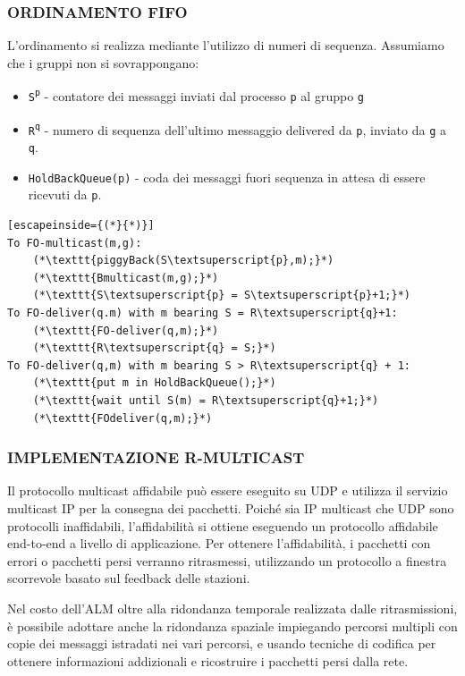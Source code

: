 \subsubsection{ORDINAMENTO FIFO}
L'ordinamento si realizza mediante l'utilizzo di numeri di sequenza. Assumiamo che i gruppi non si sovrappongano:
\begin{itemize}
   \item \texttt{S\textsuperscript{p}} - contatore dei messaggi inviati dal processo \texttt{p} al gruppo \texttt{g}
    \item \texttt{R\textsuperscript{q}} - numero di sequenza dell'ultimo messaggio delivered da \texttt{p}, inviato da \texttt{g} a \texttt{q}.
    \item \texttt{HoldBackQueue(p)} - coda dei messaggi fuori sequenza in attesa di essere ricevuti da \texttt{p}.
\end{itemize}
\begin{lstlisting}[escapeinside={(*}{*)}]
To FO-multicast(m,g):
    (*\texttt{piggyBack(S\textsuperscript{p},m);}*)
    (*\texttt{Bmulticast(m,g);}*)
    (*\texttt{S\textsuperscript{p} = S\textsuperscript{p}+1;}*)
To FO-deliver(q.m) with m bearing S = R\textsuperscript{q}+1:
    (*\texttt{FO-deliver(q,m);}*)
    (*\texttt{R\textsuperscript{q} = S;}*)
To FO-deliver(q,m) with m bearing S > R\textsuperscript{q} + 1:
    (*\texttt{put m in HoldBackQueue();}*)
    (*\texttt{wait until S(m) = R\textsuperscript{q}+1;}*)
    (*\texttt{FOdeliver(q,m);}*)
\end{lstlisting}
\subsubsection{IMPLEMENTAZIONE R-MULTICAST}
Il protocollo multicast affidabile può essere eseguito su UDP e utilizza il servizio multicast IP per la consegna dei pacchetti. Poiché sia IP multicast che UDP sono protocolli inaffidabili, l'affidabilità si ottiene eseguendo un protocollo affidabile end-to-end a livello di applicazione. Per ottenere l'affidabilità, i pacchetti con errori o pacchetti persi verranno ritrasmessi, utilizzando un protocollo a finestra scorrevole basato sul feedback delle stazioni.

Nel costo dell'ALM oltre alla ridondanza temporale realizzata dalle ritrasmissioni, è possibile adottare anche la ridondanza spaziale impiegando percorsi multipli con copie dei messaggi istradati nei vari percorsi, e usando tecniche di codifica per ottenere informazioni addizionali e ricostruire i pacchetti persi dalla rete.

